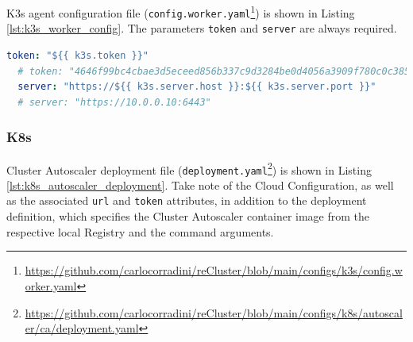 K3s agent configuration file (\texttt{config.worker.yaml}\footnote{\url{https://github.com/carlocorradini/reCluster/blob/main/configs/k3s/config.worker.yaml}})
is shown in Listing \ref{lst:k3s_worker_config}. The parameters \texttt{token}
and \texttt{server} are always required.

\begin{lstlisting}[language=yaml, alsoletter={.}, morekeywords={[2]{token, server}}, xleftmargin=\parindent, label={lst:k3s_worker_config}, caption=K3s agent configuration file]
  token: "${{ k3s.token }}"
  # token: "4646f99bc4cbae3d5eceed856b337c9d3284be0d4056a3909f780c0c385fbf93"
  server: "https://${{ k3s.server.host }}:${{ k3s.server.port }}"
  # server: "https://10.0.0.10:6443"
\end{lstlisting}

\subsubsection{K8s}
\label{subsubsec:implementation_installer_configuration_filesn_k8s}

Cluster Autoscaler deployment file (\texttt{deployment.yaml}\footnote{\url{https://github.com/carlocorradini/reCluster/blob/main/configs/k8s/autoscaler/ca/deployment.yaml}})
is shown in Listing \ref{lst:k8s_autoscaler_deployment}. Take note of the Cloud Configuration,
as well as the associated \texttt{url} and \texttt{token} attributes, in addition
to the deployment definition, which specifies the Cluster Autoscaler container
image from the respective local Registry and the command arguments.

